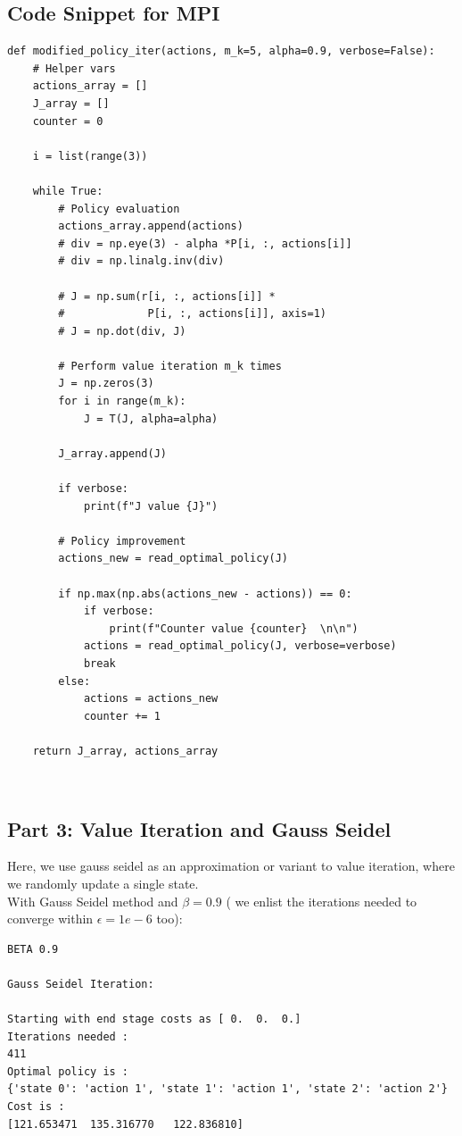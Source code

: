 \subsection{Code Snippet for MPI} 

\begin{lstlisting}
def modified_policy_iter(actions, m_k=5, alpha=0.9, verbose=False):
    # Helper vars
    actions_array = []
    J_array = []
    counter = 0

    i = list(range(3))

    while True:
        # Policy evaluation
        actions_array.append(actions)
        # div = np.eye(3) - alpha *P[i, :, actions[i]]
        # div = np.linalg.inv(div)

        # J = np.sum(r[i, :, actions[i]] *
        #             P[i, :, actions[i]], axis=1)
        # J = np.dot(div, J)

        # Perform value iteration m_k times
        J = np.zeros(3)
        for i in range(m_k):
            J = T(J, alpha=alpha)

        J_array.append(J)

        if verbose:
            print(f"J value {J}")

        # Policy improvement
        actions_new = read_optimal_policy(J)

        if np.max(np.abs(actions_new - actions)) == 0:
            if verbose:
                print(f"Counter value {counter}  \n\n")
            actions = read_optimal_policy(J, verbose=verbose)
            break
        else:
            actions = actions_new
            counter += 1

    return J_array, actions_array
\end{lstlisting}\\

\subsection{Part 3: Value Iteration and Gauss Seidel}

Here, we use gauss seidel as an approximation or variant to value iteration, where we randomly update a single state. \\

With Gauss Seidel method and $\beta = 0.9$ ( we enlist the iterations needed to converge within $\epsilon = 1e-6$ too):

\begin{lstlisting}
BETA 0.9

Gauss Seidel Iteration: 

Starting with end stage costs as [ 0.  0.  0.]
Iterations needed : 
411
Optimal policy is :
{'state 0': 'action 1', 'state 1': 'action 1', 'state 2': 'action 2'}
Cost is : 
[121.653471  135.316770   122.836810]
\end{lstlisting}\\

